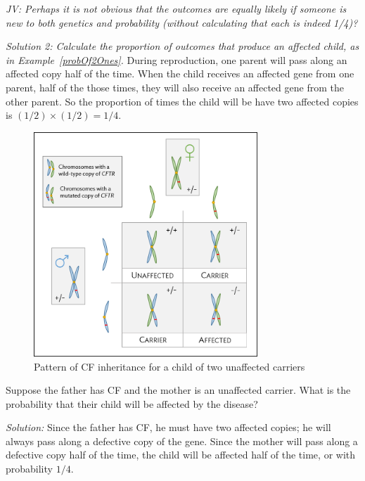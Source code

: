 \begin{doublespace}
\begin{example}
\textit{JV: Perhaps it is not obvious that the outcomes are equally likely if someone is new to both genetics and probability (without calculating that each is indeed 1/4)?}

\textit{Solution 2:  Calculate the proportion of outcomes that produce an affected child, as in Example~\ref{probOf2Ones}.}  During reproduction, one parent will pass along an affected copy half of the time.  When the child receives an affected gene from one parent, half of the those times, they will also receive an affected gene from the other parent.	So the proportion of times the child will be have two affected copies is $(1/2) \times (1/2) = 1/4$.
\end{example}

\begin{figure}
	\centering
	\includegraphics[width= 0.75\textwidth]{ch_probability_oi_biostat/figures/cfInheritance/cfInheritance.png}
	\caption{Pattern of CF inheritance for a child of two unaffected carriers}
	\label{fig:cfInheritance}
\end{figure}

\begin{exercise}
Suppose the father has CF and the mother is an unaffected carrier.  What is the probability that their child will be affected by the disease?

\textit{Solution:}  Since the father has CF, he must have two affected copies; he will always pass along a defective copy of the gene.  Since the mother will pass along a defective copy half of the time, the child will be affected half of the time, or with probability $1/4$.


\end{exercise}
\end{doublespace}
